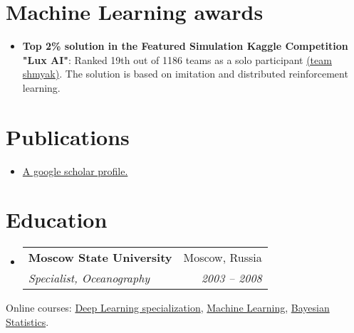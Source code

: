 \documentclass[letterpaper,12pt]{article}
\makeatletter
\newcommand{\resumeItem}[2]{
  \item\small{
    \textbf{#1}{: #2 \vspace{-2pt}}
  }
}
\newcommand{\resumePubItem}[2]{
  \item\small{
    \textbf{#1}{ #2 \vspace{-2pt}}
  }
}
\newcommand{\resumeSubheading}[4]{
  \vspace{-1pt}\item
    \begin{tabular*}{0.97\textwidth}[t]{l@{\extracolsep{\fill}}r}
      \textbf{#1} & #2 \\
      \textit{\small#3} & \textit{\small #4} \\
    \end{tabular*}\vspace{+1pt}
}
\newcommand{\resumeSubHeadingListStart}{\begin{itemize}[leftmargin=*]}
\newcommand{\resumeSubHeadingListEnd}{\end{itemize}}
\makeatother
\begin{document}
\section{Machine Learning awards}
\resumeSubHeadingListStart

\resumeItem{Top 2\% solution in the Featured Simulation Kaggle Competition "Lux AI"}
{Ranked 19th out of 1186 teams as a solo participant \href{https://www.kaggle.com/c/lux-ai-2021/leaderboard}{(team shmyak)}.
	The solution is based on imitation and distributed reinforcement learning.
}

\resumeSubHeadingListEnd

\section{Publications}
  \resumeSubHeadingListStart
    \resumePubItem{}
      {\href{https://scholar.google.com/citations?hl=en&user=72diaAiPvoYC&view_op=list_works&sortby=pubdate}{A google scholar profile.}}
  \resumeSubHeadingListEnd

\section{Education}
  \resumeSubHeadingListStart
    \resumeSubheading
      {Moscow State University}{Moscow, Russia}
      {Specialist, Oceanography}{2003 -- 2008}
  \resumeSubHeadingListEnd
  
  Online courses:
  {\href{https://coursera.org/share/738f07c3514e74b4b4a2ec4c7df53d11}{Deep Learning specialization},
   \href{https://coursera.org/share/a7e216966ca1e16fd6c58b7d58cb0806}{Machine Learning},
   \href{https://coursera.org/share/2a20ba63d42f5a2557db34e3e9837382}{Bayesian Statistics}.}

\end{document}
